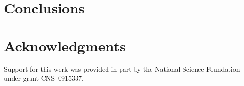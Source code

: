 \documentclass{sig-alternate}
\begin{document}
\section{Conclusions}\label{conclusions}



\section{Acknowledgments}

Support for this work was provided in part by the National Science Foundation
under grant CNS--0915337.  


 

\balancecolumns
\end{document}
